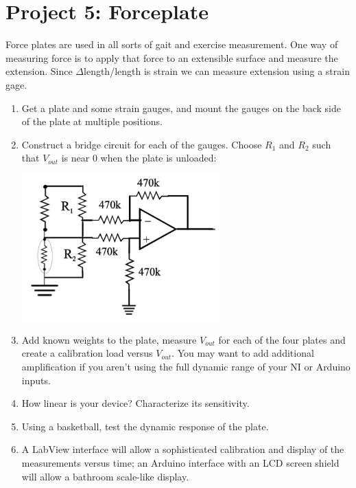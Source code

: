 \documentclass[12pt]{article}
\begin{document}
\newpage

\section*{Project 5: Forceplate}

Force plates are used in all sorts of gait and exercise measurement. 
One way of measuring force is to apply that force to an extensible surface and measure the extension. 
Since $\Delta$length/length is strain we can measure extension using a strain gage.

\begin{enumerate}
\item Get a plate and some strain gauges, and mount the gauges on the back side of the plate 
at multiple positions.
\item Construct a bridge circuit for each of the gauges. 
Choose $R_1$ and $R_2$ such that $V_{out}$ is near 0 when the plate is unloaded:
\begin{center}
\includegraphics[width=0.6\textwidth]{forceplatebridge.png}
\end{center}
\item Add known weights to the plate, measure $V_{out}$ for each of the four plates and create a calibration load versus $V_{out}$.
You may want to add additional amplification if you aren't using the full dynamic range of your NI or Arduino inputs.
\item How linear is your device? Characterize its sensitivity.
\item Using a basketball, test the dynamic response of the plate.
\item A LabView interface will allow a sophisticated calibration and display of the measurements versus time; an Arduino interface with an LCD screen shield
will allow a bathroom scale-like display.
\end{enumerate}

\newpage
\end{document}

